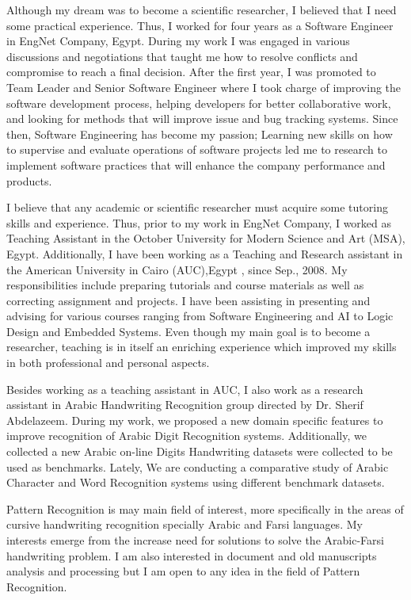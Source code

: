 \documentclass[10pt]{article}%
\begin{document}
 	Although my dream was to become a scientific researcher, I believed that I need some practical experience. Thus, I worked for four years as a Software Engineer in EngNet Company, Egypt. During my work I was engaged in various discussions and negotiations that taught me how to resolve conflicts and compromise to reach a final decision. After the first year, I was promoted to Team Leader and Senior Software Engineer where I took charge of improving the software development process, helping developers for better collaborative work, and looking for methods that will improve issue and bug tracking systems. Since then, Software Engineering has become my passion;  Learning new skills on how to supervise and evaluate operations of software projects led me to research to implement software practices that will enhance the company performance and products.

I believe that any academic or scientific researcher must acquire some tutoring skills and experience. Thus, prior to my work in EngNet Company, I worked as Teaching Assistant in the October University for Modern Science and Art (MSA), Egypt. Additionally, I have been working as a Teaching and Research assistant in the American University in Cairo (AUC),Egypt , since Sep., 2008. My responsibilities include preparing tutorials and course materials as well as correcting assignment and projects. I have been assisting in presenting and advising for various courses ranging from Software Engineering and AI to Logic Design and Embedded Systems. Even though my main goal is to become a researcher, teaching is in itself an enriching experience which improved my skills in both professional and personal aspects.

%
 	Besides working as a teaching assistant in AUC, I also work as a research assistant in Arabic Handwriting Recognition group directed by Dr. Sherif Abdelazeem. During my work, we proposed a new domain specific features to improve recognition of Arabic Digit Recognition systems. Additionally, we collected a new Arabic on-line Digits Handwriting datasets were collected to be used as benchmarks. Lately, We are conducting a comparative study of Arabic Character and Word Recognition systems using different benchmark datasets.


%
Pattern Recognition is may main field of interest, more specifically in the areas of cursive handwriting recognition specially Arabic and Farsi languages. My interests emerge from the increase need for solutions to solve the Arabic-Farsi handwriting problem. I am also interested in document and old manuscripts analysis and processing but I am open to any idea in the field of Pattern Recognition.%
%
\end{document}
